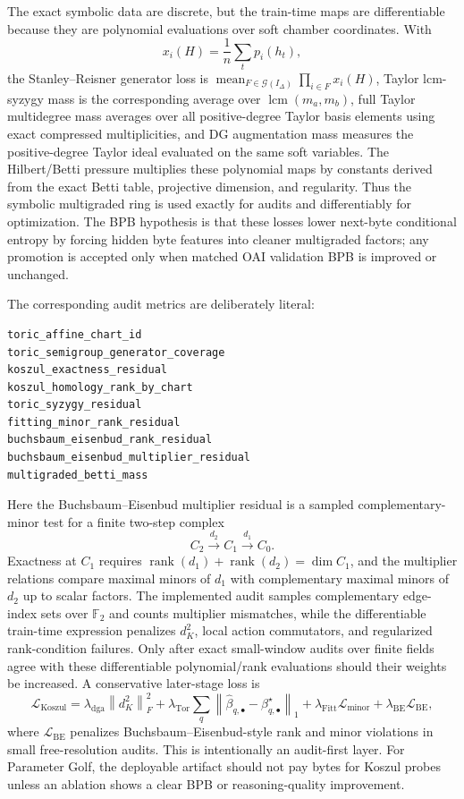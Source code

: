 \documentclass[11pt]{article}
\theoremstyle{definition}
\theoremstyle{plain}
\theoremstyle{remark}
\numberwithin{equation}{section}
\newcommand{\mean}{\operatorname*{mean}}
\newcommand{\rank}{\operatorname{rank}}
\newcommand{\norm}[1]{\left\lVert #1\right\rVert}
\begin{document}
The exact symbolic data are discrete, but the train-time maps are differentiable because they are polynomial evaluations over soft chamber coordinates.  With
\[
  x_i(H)=\frac1n\sum_t p_i(h_t),
\]
the Stanley--Reisner generator loss is $\mean_{F\in\mathcal G(I_\Delta)}\prod_{i\in F}x_i(H)$, Taylor lcm-syzygy mass is the corresponding average over $\operatorname{lcm}(m_a,m_b)$, full Taylor multidegree mass averages over all positive-degree Taylor basis elements using exact compressed multiplicities, and DG augmentation mass measures the positive-degree Taylor ideal evaluated on the same soft variables.  The Hilbert/Betti pressure multiplies these polynomial maps by constants derived from the exact Betti table, projective dimension, and regularity.  Thus the symbolic multigraded ring is used exactly for audits and differentiably for optimization.  The BPB hypothesis is that these losses lower next-byte conditional entropy by forcing hidden byte features into cleaner multigraded factors; any promotion is accepted only when matched OAI validation BPB is improved or unchanged.

The corresponding audit metrics are deliberately literal:
\begin{verbatim}
toric_affine_chart_id
toric_semigroup_generator_coverage
koszul_exactness_residual
koszul_homology_rank_by_chart
toric_syzygy_residual
fitting_minor_rank_residual
buchsbaum_eisenbud_rank_residual
buchsbaum_eisenbud_multiplier_residual
multigraded_betti_mass
\end{verbatim}
Here the Buchsbaum--Eisenbud multiplier residual is a sampled complementary-minor test for a finite two-step complex
\begin{equation}
  C_2\xrightarrow{d_2}C_1\xrightarrow{d_1}C_0.
\end{equation}
Exactness at $C_1$ requires $\rank(d_1)+\rank(d_2)=\dim C_1$, and the multiplier relations compare maximal minors of $d_1$ with complementary maximal minors of $d_2$ up to scalar factors.  The implemented audit samples complementary edge-index sets over $\mathbb F_2$ and counts multiplier mismatches, while the differentiable train-time expression penalizes $d_K^2$, local action commutators, and regularized rank-condition failures.
Only after exact small-window audits over finite fields agree with these differentiable polynomial/rank evaluations should their weights be increased.  A conservative later-stage loss is
\begin{equation}
  \mathcal L_{\mathrm{Koszul}}=
  \lambda_{\mathrm{dga}}\norm{d_K^2}_F^2+
  \lambda_{\mathrm{Tor}}\sum_q\norm{\widehat\beta_{q,\bullet}-\beta^\star_{q,\bullet}}_1+
  \lambda_{\mathrm{Fitt}}\mathcal L_{\mathrm{minor}}+
  \lambda_{\mathrm{BE}}\mathcal L_{\mathrm{BE}},
\end{equation}
where $\mathcal L_{\mathrm{BE}}$ penalizes Buchsbaum--Eisenbud-style rank and minor violations in small free-resolution audits.  This is intentionally an audit-first layer.  For Parameter Golf, the deployable artifact should not pay bytes for Koszul probes unless an ablation shows a clear BPB or reasoning-quality improvement.
\end{document}
